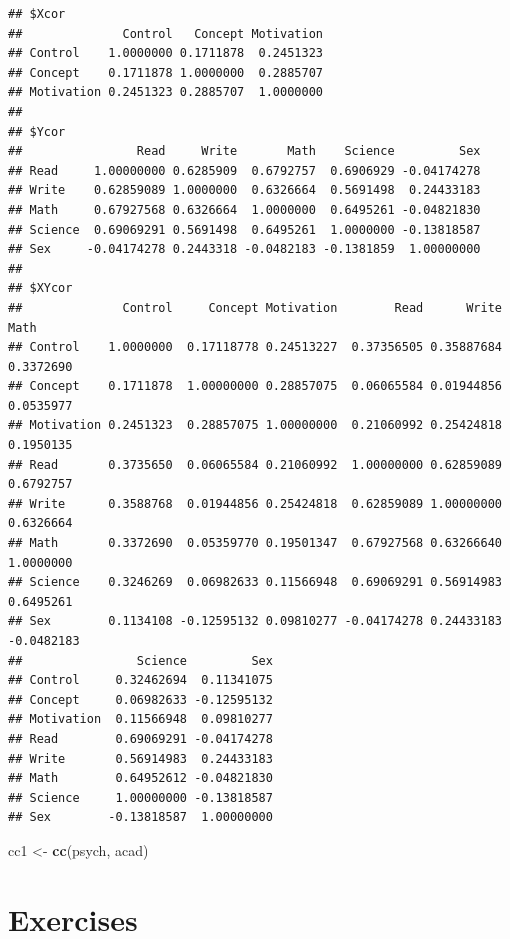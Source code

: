\documentclass[]{book}
\newenvironment{Shaded}{\begin{snugshade}}{\end{snugshade}}
\newcommand{\KeywordTok}[1]{\textcolor[rgb]{0.13,0.29,0.53}{\textbf{#1}}}
\newcommand{\NormalTok}[1]{#1}
\newcommand{\StringTok}[1]{\textcolor[rgb]{0.31,0.60,0.02}{#1}}
\theoremstyle{definition}
\theoremstyle{definition}
\theoremstyle{definition}
\theoremstyle{remark}
\begin{document}
\begin{verbatim}
## $Xcor
##              Control   Concept Motivation
## Control    1.0000000 0.1711878  0.2451323
## Concept    0.1711878 1.0000000  0.2885707
## Motivation 0.2451323 0.2885707  1.0000000
## 
## $Ycor
##                Read     Write       Math    Science         Sex
## Read     1.00000000 0.6285909  0.6792757  0.6906929 -0.04174278
## Write    0.62859089 1.0000000  0.6326664  0.5691498  0.24433183
## Math     0.67927568 0.6326664  1.0000000  0.6495261 -0.04821830
## Science  0.69069291 0.5691498  0.6495261  1.0000000 -0.13818587
## Sex     -0.04174278 0.2443318 -0.0482183 -0.1381859  1.00000000
## 
## $XYcor
##              Control     Concept Motivation        Read      Write       Math
## Control    1.0000000  0.17118778 0.24513227  0.37356505 0.35887684  0.3372690
## Concept    0.1711878  1.00000000 0.28857075  0.06065584 0.01944856  0.0535977
## Motivation 0.2451323  0.28857075 1.00000000  0.21060992 0.25424818  0.1950135
## Read       0.3735650  0.06065584 0.21060992  1.00000000 0.62859089  0.6792757
## Write      0.3588768  0.01944856 0.25424818  0.62859089 1.00000000  0.6326664
## Math       0.3372690  0.05359770 0.19501347  0.67927568 0.63266640  1.0000000
## Science    0.3246269  0.06982633 0.11566948  0.69069291 0.56914983  0.6495261
## Sex        0.1134108 -0.12595132 0.09810277 -0.04174278 0.24433183 -0.0482183
##                Science         Sex
## Control     0.32462694  0.11341075
## Concept     0.06982633 -0.12595132
## Motivation  0.11566948  0.09810277
## Read        0.69069291 -0.04174278
## Write       0.56914983  0.24433183
## Math        0.64952612 -0.04821830
## Science     1.00000000 -0.13818587
## Sex        -0.13818587  1.00000000
\end{verbatim}

\begin{Shaded}
\begin{Highlighting}[]
\NormalTok{cc1 <-}\StringTok{ }\KeywordTok{cc}\NormalTok{(psych, acad)}
\end{Highlighting}
\end{Shaded}

\hypertarget{exercises-2}{%
\section{Exercises}\label{exercises-2}}
\end{document}
